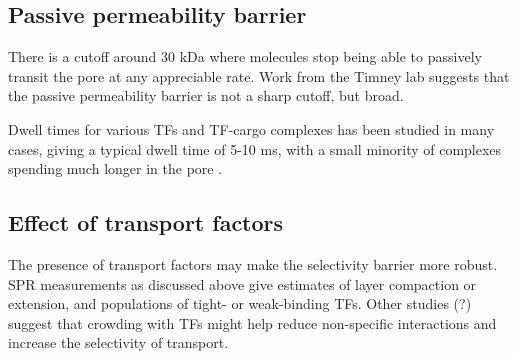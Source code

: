 \subsection{Passive permeability barrier}
There is a cutoff around 30 kDa where molecules stop being able to passively transit the pore at any appreciable rate.  Work from the Timney lab suggests that the passive permeability barrier is not a sharp cutoff, but broad.

Dwell times for various TFs and TF-cargo complexes has been studied in many cases, giving a typical dwell time of 5-10 ms, with a small minority of complexes spending much longer in the pore \cite{tu11}.

%
\subsection{Effect of transport factors}
The presence of transport factors may make the selectivity barrier more robust.  SPR measurements as discussed above give estimates of layer compaction or extension, and populations of tight- or weak-binding TFs.  Other studies (?) suggest that crowding with TFs might help reduce non-specific interactions and increase the selectivity of transport.
